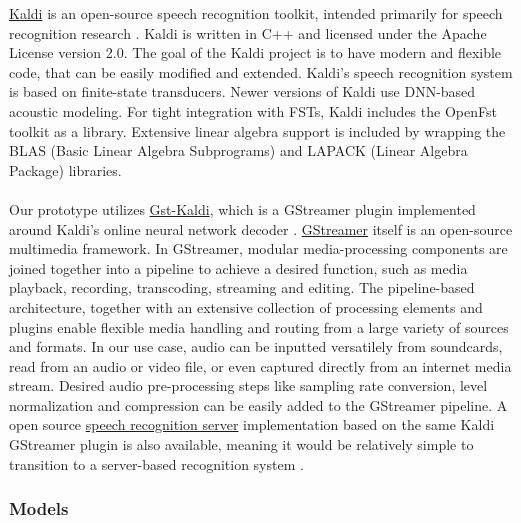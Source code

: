 \documentclass[english, 12pt, a4paper, pdftex, elec, utf8]{aaltothesis}
\begin{document}
\href{http://kaldi-asr.org}{Kaldi} is an open-source speech recognition toolkit, intended primarily for speech recognition research \cite{kaldi}. Kaldi is written in C++ and licensed under the Apache License version 2.0. The goal of the Kaldi project is to have modern and flexible code, that can be easily modified and extended. Kaldi's speech recognition system is based on finite-state transducers. Newer versions of Kaldi use DNN-based acoustic modeling. For tight integration with FSTs, Kaldi includes the OpenFst toolkit as a library. Extensive linear algebra support is included by wrapping the BLAS (Basic Linear Algebra Subprograms) and LAPACK (Linear Algebra Package) libraries. \\\\
Our prototype utilizes \href{https://github.com/alumae/gst-kaldi-nnet2-online}{Gst-Kaldi}, which is a GStreamer plugin implemented around Kaldi's online neural network decoder \cite{alumae2014full}. \href{https://gstreamer.freedesktop.org/}{GStreamer} itself is an open-source multimedia framework. In GStreamer, modular media-processing components are joined together into a pipeline to achieve a desired function, such as media playback, recording, transcoding, streaming and editing. The pipeline-based architecture, together with an extensive collection of processing elements and plugins enable flexible media handling and routing from a large variety of sources and formats. In our use case, audio can be inputted versatilely from soundcards, read from an audio or video file, or even captured directly from an internet media stream. Desired audio pre-processing steps like sampling rate conversion, level normalization and compression can be easily added to the GStreamer pipeline. A open source \href{https://github.com/alumae/kaldi-gstreamer-server}{speech recognition server} implementation based on the same Kaldi GStreamer plugin is also available, meaning it would be relatively simple to transition to a server-based recognition system \cite{alumae2012open}.

\subsubsection{Models} \label{sec:models}
\end{document}
